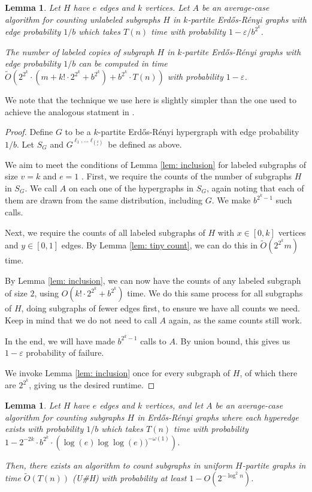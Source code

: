 \documentclass[11pt,letterpaper,pdftex]{article}
\newtheorem{lemma}[theorem]{Lemma}
\def\gchosenlabels{G^{\ell_1,...\ell_{\binom{k}{c}}}}
\def\Otil{\tilde{O}}
\begin{document}
\begin{lemma}\label{lem: AC to HP count}
Let $H$ have $e$ edges and $k$ vertices. Let $A$ be an average-case algorithm for counting unlabeled subgraphs $H$ in $k$-partite Erd{\H{o}}s-R{\'{e}}nyi graphs with edge probability $1/b$ which takes $T(n)$ time with probability $1 - \varepsilon/b^{2^k }$.

The number of labeled copies of subgraph $H$ in $k$-partite Erd{\H{o}}s-R{\'{e}}nyi graphs with edge probability $1/b$ can be computed in time $\Otil \left(2^{2^k} \cdot \left(m + k!\cdot 2^{2^k } + b^{2^k }\right) + b^{2^k  } \cdot T(n) \right) $ with probability $1-\varepsilon$.
\end{lemma}

We note that the technique we use here is slightly simpler than the one used to achieve the analogous statment in \cite{factoredProblems}.


\begin{proof}
Define $G$ to be a $k$-partite Erd{\H{o}}s-R{\'{e}}nyi hypergraph with edge probability $1/b$. Let $S_G$ and $\gchosenlabels$ be defined as above.

We aim to meet the conditions of Lemma \ref{lem: inclusion} for labeled subgraphs of size $v=k$ and $e=1$ . First, we require the counts of the number of subgraphs $H$ in $S_G$. We call $A$ on each one of the hypergraphs in $S_G$, again noting that each of them are drawn from the same distribution, including $G$. We make $b^{2^k -1 }$ such calls.

Next, we require the counts of all labeled subgraphs of $H$ with $x\in [0,k]$ vertices and $y\in [0,1]$ edges. By Lemma \ref{lem: tiny count}, we can do this in $\Otil( 2^{2^k} m)$ time.

By Lemma \ref{lem: inclusion}, we can now have the counts of any labeled subgraph of size $2$, using $O(k!\cdot 2^{2^k } + b^{2^k })$ time. We do this same process for all subgraphs of $H$, doing subgraphs of fewer edges first, to ensure we have all counts we need. Keep in mind that we do not need to call $A$ again, as the same counts still work.

In the end, we will have made $b^{2^k - 1 }$ calls to $A$. By union bound, this gives us $1-\varepsilon$ probability of failure.

We invoke Lemma \ref{lem: inclusion} once for every subgraph of $H$, of which there are $2^{2^k}$, giving us the desired runtime.
\end{proof}

\begin{lemma} \label{lem:WCtoAC}
Let $H$ have $e$ edges and $k$ vertices, and let $A$ be an average-case algorithm for counting subgraphs $H$ in Erd{\H{o}}s-R{\'{e}}nyi graphs where each hyperedge exists with probability $1/b$ which takes $T(n)$ time with probability $1-2^{-2k}\cdot b^{2^k}\cdot\left(\log(e)\log\log(e))^{-\omega(1)}\right)$.

Then, there exists an algorithm to count subgraphs in uniform $H$-partite graphs in time $\Otil(T(n))$ (U\#H) with probability at least $1-O(2^{-\log^2{n} } )$.

\end{lemma}
\end{document}
